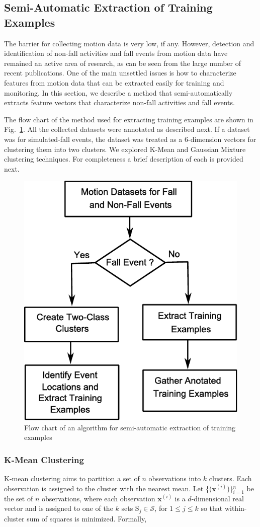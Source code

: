 \documentclass[]{IEEEtran}
\begin{document}
\subsection{Semi-Automatic  Extraction of Training Examples}

The barrier for collecting motion data is very low, if any. However, detection
and identification of non-fall activities and fall events from motion data have
remained an active area of research, as can be seen from the large number of
recent publications. One of the main unsettled issues is how to characterize
features from motion data that can be extracted easily for training and
monitoring. In this section, we describe a method that semi-automatically
extracts feature vectors that characterize non-fall activities and fall events.

The flow chart of the method used for extracting training examples are shown in
Fig.~\ref{fig:FlowChartforAlgorTrainingExamples}. All the collected datasets
were annotated as described next. If a dataset was for simulated-fall events,
the dataset was treated as a 6-dimension vectors for clustering them into two
clusters. We explored K-Mean and Gaussian Mixture clustering techniques. For
completeness a brief description of each is provided next.

\begin{figure}[!htb]
	\centering
		\includegraphics[width = 0.6\columnwidth]{figures/FlowChartAlgoForTrainingExamples.pdf}
	\caption{Flow chart of an algorithm for semi-automatic extraction of training 
	examples}
	\label{fig:FlowChartforAlgorTrainingExamples}
\end{figure}

\subsubsection{K-Mean Clustering\cite{Bishop:2006:PRM:1162264}} K-mean
clustering aims to partition a set of $n$ observations into $k$ clusters. Each
observation is assigned to the cluster with the nearest mean. Let
\{($\mathbf{x}^{(i)}$)\}$_{i=1}^n$  be the set of $n$ observations, where each
observation $\mathbf{x}^{(i)}$ is a $d$-dimensional real vector and is assigned
to one of the $k$ sets $\mathrm{S}_j \in \mathcal{S}$, for $ 1 \leq  j \leq k$
so that within-cluster sum of squares is minimized. Formally,
\end{document}
